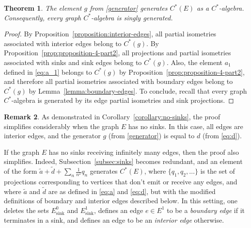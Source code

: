 \documentclass[12pt, a4paper]
{amsart}
\newtheorem{thm}{Theorem}
\theoremstyle{definition}
\newtheorem{remark}[thm]{Remark}
\theoremstyle{remark}
\numberwithin{equation}{section}
\newcommand{\Esink}{E^0_{\mathrm{sink}}}
\newcommand{\edgesink}{E^1_{\mathrm{sink}}}
\newcommand{\Cstar}{\ensuremath{C^*}}
\begin{document}
\begin{thm}
    The element $g$ from \eqref{generator} generates $\Cstar(E)$ as a \Cstar-algebra.
    Consequently, every graph \Cstar-algebra is singly generated.
\end{thm}

\begin{proof}
    By Proposition~\ref{proposition:interior-edges}, all partial isometries associated with interior edges belong to $\Cstar(g)$. By Proposition~\ref{prop:proposition-4-part2}, all projections and partial isometries associated with sinks and sink edges belong to $\Cstar(g)$. Also, the element $a_1$ defined in \eqref{eq:a_1} belongs to $\Cstar(g)$ by Proposition~\ref{prop:proposition-4-part2}, and therefore all partial isometries associated with boundary edges belong to $\Cstar(g)$ by Lemma~\ref{lemma:boundary-edges}.
    To conclude, recall that every graph \Cstar-algebra is generated by its edge partial isometries and sink projections.
\end{proof}


\begin{remark}
    As demonstrated in Corollary~\ref{corollary:no-sinks}, the proof simplifies considerably when the graph $E$ has no sinks. In this case, all edges are interior edges, and the generator $g$ (from \eqref{generator}) is equal to $d$ (from \eqref{eq:d}).
    
    If the graph $E$ has no sinks receiving infinitely many edges, then the proof also simplifies. Indeed, Subsection~\ref{subsec:sinks} becomes redundant, and an element of the form $\tilde{a}+\tilde{d}+\sum_{n} \frac{1}{n^2}q_n$ generates $\Cstar(E)$, where $\{q_1, q_2, \dots\}$ is the set of projections corresponding to vertices that don't emit or receive any edges, and where $\tilde{a}$ and $\tilde{d}$ are as defined in \eqref{eq:a} and \eqref{eq:d}, but with the modified definitions of boundary and interior edges described below. In this setting, one deletes the sets $\Esink$ and $\edgesink$, defines an edge $e \in E^1$ to be a \emph{boundary edge} if it terminates in a sink, and defines an edge to be an \emph{interior edge} otherwise.
\end{remark}





\end{document}
